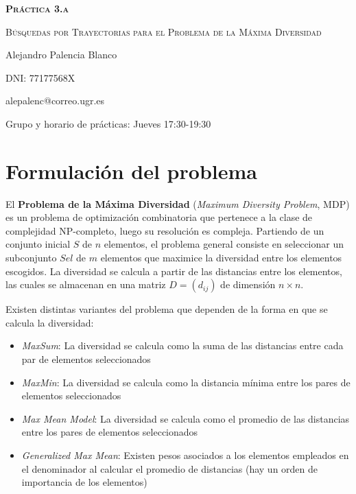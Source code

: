 \documentclass[10pt,a4paper]{article}
\begin{document}
\begin{titlepage}
	\centering
	{\bfseries\scshape\Huge Práctica 3.a \par}
	\vspace{3cm}
	{\scshape\Huge Búsquedas por Trayectorias para el Problema de la Máxima Diversidad \par}
	\vfill
	{\Large Alejandro Palencia Blanco \par}
	\vspace{1cm}
	{\Large DNI: 77177568X \par}
	\vspace{1cm}
	{\Large alepalenc@correo.ugr.es \par}
	\vspace{1cm}
	\vfill
	{\Large Grupo y horario de prácticas: Jueves 17:30-19:30 \par}
\end{titlepage}

\newpage

\tableofcontents

\newpage

\section{Formulación del problema}

El \textbf{Problema de la Máxima Diversidad} (\textit{Maximum Diversity Problem}, MDP) es un problema de optimización combinatoria que pertenece a la clase de complejidad NP-completo, luego su resolución es compleja. Partiendo de un conjunto inicial $S$ de $n$ elementos, el problema general consiste en seleccionar un subconjunto $Sel$ de $m$ elementos que maximice la diversidad entre los elementos escogidos. La diversidad se calcula a partir de las distancias entre los elementos, las cuales se almacenan en una matriz $D = (d_{ij})$ de dimensión $n \times n$.

Existen distintas variantes del problema que dependen de la forma en que se calcula la diversidad:

\begin{itemize}
	\item \textit{MaxSum}: La diversidad se calcula como la suma de las
	distancias entre cada par de elementos seleccionados
	\item \textit{MaxMin}: La diversidad se calcula como la distancia
	mínima entre los pares de elementos seleccionados
	\item \textit{Max Mean Model}: La diversidad se calcula como el promedio de
	las distancias entre los pares de elementos seleccionados
	\item \textit{Generalized Max Mean}: Existen pesos asociados a los elementos
	empleados en el denominador al calcular el promedio de
	distancias (hay un orden de importancia de los elementos)
\end{itemize}
\end{document}
